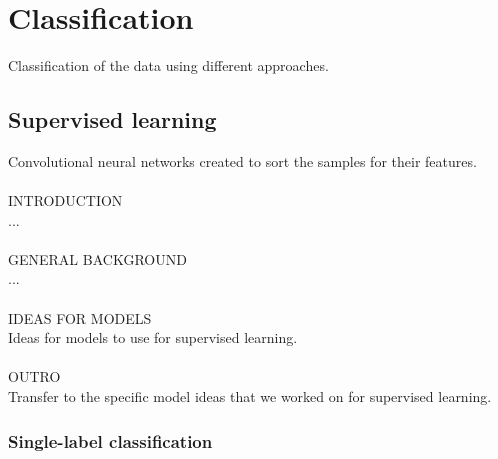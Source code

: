 \section{Classification}

Classification of the data using different approaches.

\subsection{Supervised learning}

Convolutional neural networks created to sort the samples for their features. \\
\\
INTRODUCTION \\
... \\
\\
GENERAL BACKGROUND \\
... \\
\\
IDEAS FOR MODELS \\
Ideas for models to use for supervised learning. \\
\\
OUTRO \\
Transfer to the specific model ideas that we worked on for supervised learning.

\subsubsection{Single-label classification}

